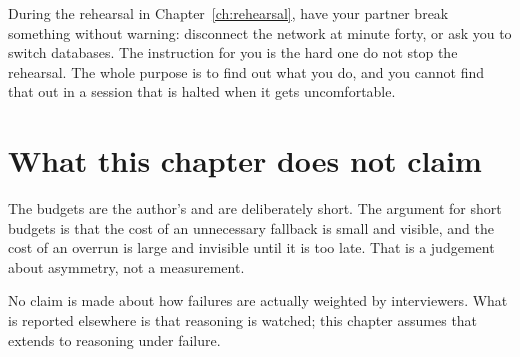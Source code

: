 
\begin{drill}
During the rehearsal in Chapter~\ref{ch:rehearsal}, have your partner break
something without warning: disconnect the network at minute forty, or ask you
to switch databases. The instruction for you is the hard one \dash{} do not
stop the rehearsal. The whole purpose is to find out what you do, and you
cannot find that out in a session that is halted when it gets uncomfortable.
\end{drill}

\section*{What this chapter does not claim}

The budgets are the author's and are deliberately short. The argument for short
budgets is that the cost of an unnecessary fallback is small and visible, and
the cost of an overrun is large and invisible until it is too late. That is a
judgement about asymmetry, not a measurement.

No claim is made about how failures are actually weighted by interviewers. What
is reported elsewhere is that reasoning is watched; this chapter assumes that
extends to reasoning under failure.
